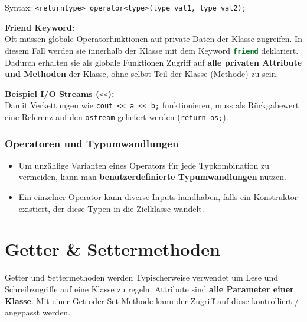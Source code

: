 Syntax: \verb|<returntype> operator<type>(type val1, type val2);|\medskip

\textbf{Friend Keyword:}\\
Oft müssen globale Operatorfunktionen auf private Daten der Klasse zugreifen. 
In diesem 
Fall werden sie innerhalb der Klasse mit dem Keyword \lstinline[language=C++]|friend| deklariert. 
Dadurch erhalten sie als globale Funktionen Zugriff auf \textbf{alle privaten Attribute 
und Methoden} der Klasse, ohne selbst Teil der Klasse (Methode) zu sein. 



\textbf{Beispiel I/O Streams (\lstinline[language=C++]|<<|):}\\
Damit Verkettungen wie \verb|cout << a << b;| 
funktionieren, muss als Rückgabewert eine Referenz auf den \verb|ostream| geliefert werden (\verb|return os;|).


\subsubsection{Operatoren und Typumwandlungen}
\begin{itemize}
    \item Um unzählige Varianten eines Operators für jede Typkombination zu vermeiden, kann man \textbf{benutzerdefinierte Typumwandlungen} nutzen.
    \item Ein einzelner Operator kann diverse Inputs handhaben, falls ein Konstruktor existiert, der diese Typen in die Zielklasse wandelt.
\end{itemize}



\section{Getter \& Settermethoden}

Getter und Settermethoden werden Typischerweise verwendet um Lese und Schreibzugriffe auf eine Klasse zu regeln. 
Attribute sind \textbf{alle Parameter einer Klasse}.
Mit einer Get oder Set Methode kann der Zugriff auf diese kontrolliert / angepasst werden.\medskip


